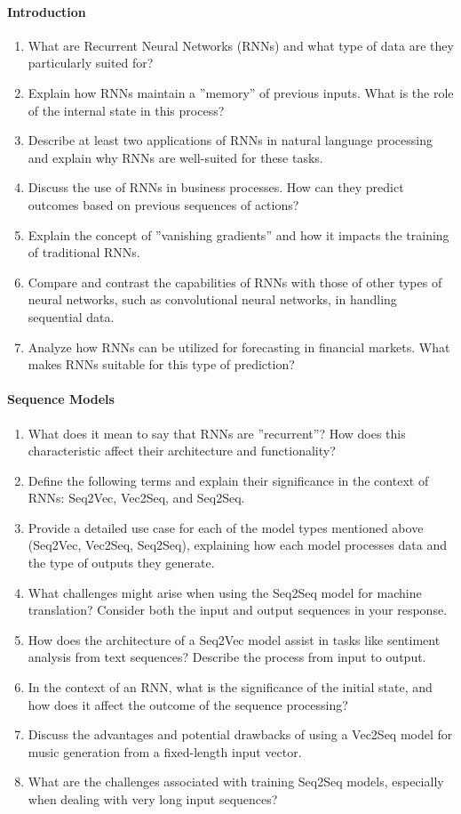 \paragraph*{Introduction}
\begin{enumerate}[nosep]
	\item What are Recurrent Neural Networks (RNNs) and what type of data are they particularly suited for?
	\item Explain how RNNs maintain a ''memory'' of previous inputs. What is the role of the internal state in this process?
	\item Describe at least two applications of RNNs in natural language processing and explain why RNNs are well-suited for these tasks.
	\item Discuss the use of RNNs in business processes. How can they predict outcomes based on previous sequences of actions?
	\item Explain the concept of ''vanishing gradients'' and how it impacts the training of traditional RNNs.
	\item Compare and contrast the capabilities of RNNs with those of other types of neural networks, such as convolutional neural networks, in handling sequential data.
	\item Analyze how RNNs can be utilized for forecasting in financial markets. What makes RNNs suitable for this type of prediction?
\end{enumerate}

\paragraph*{Sequence Models}

\begin{enumerate}
	\item What does it mean to say that RNNs are ''recurrent''? How does this characteristic affect their architecture and functionality?
	\item Define the following terms and explain their significance in the context of RNNs: Seq2Vec, Vec2Seq, and Seq2Seq.
	\item Provide a detailed use case for each of the model types mentioned above (Seq2Vec, Vec2Seq, Seq2Seq), explaining how each model processes data and the type of outputs they generate.
	\item What challenges might arise when using the Seq2Seq model for machine translation? Consider both the input and output sequences in your response.
	\item How does the architecture of a Seq2Vec model assist in tasks like sentiment analysis from text sequences? Describe the process from input to output.
	\item In the context of an RNN, what is the significance of the initial state, and how does it affect the outcome of the sequence processing?
	\item Discuss the advantages and potential drawbacks of using a Vec2Seq model for music generation from a fixed-length input vector.
	\item What are the challenges associated with training Seq2Seq models, especially when dealing with very long input sequences?
\end{enumerate}

